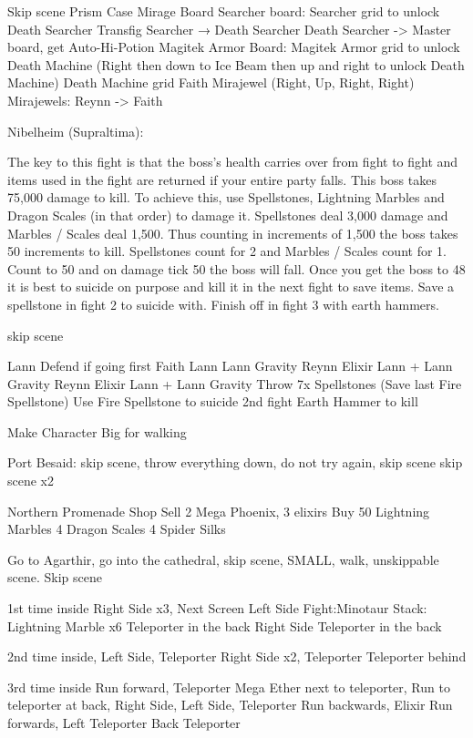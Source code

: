 Skip scene
Prism Case
Mirage Board
Searcher board:
Searcher grid to unlock Death Searcher
Transfig Searcher → Death Searcher
Death Searcher ->  
Master board, get Auto-Hi-Potion
Magitek Armor Board:
Magitek Armor grid to unlock Death Machine (Right then down to Ice Beam then up and right to unlock Death Machine)
Death Machine grid Faith Mirajewel (Right, Up, Right, Right)
Mirajewels:
Reynn -> Faith

Nibelheim (Supraltima):

The key to this fight is that the boss’s health carries over from fight to fight and items used in the fight are returned if your entire party falls. This boss takes 75,000 damage to kill. To achieve this, use Spellstones, Lightning Marbles and Dragon Scales (in that order) to damage it. Spellstones deal 3,000 damage and Marbles / Scales deal 1,500. Thus counting in increments of 1,500 the boss takes 50 increments to kill. Spellstones count for 2 and Marbles / Scales count for 1. Count to 50 and on damage tick 50 the boss will fall. Once you get the boss to 48 it is best to suicide on purpose and kill it in the next fight to save items. Save a spellstone in fight 2 to suicide with. Finish off in fight 3 with earth hammers.

skip scene

Lann Defend if going first
Faith Lann
Lann Gravity
Reynn Elixir Lann + Lann Gravity
Reynn Elixir Lann + Lann Gravity
Throw 7x Spellstones (Save last Fire Spellstone)
Use Fire Spellstone to suicide
2nd fight Earth Hammer to kill

Make Character Big for walking

Port Besaid: 
skip scene, throw everything down, do not try again, skip scene
skip scene x2

Northern Promenade
         Shop 
Sell
2 Mega Phoenix, 
3 elixirs
Buy
50 Lightning Marbles
4 Dragon Scales
4 Spider Silks
 
Go to Agarthir, go into the cathedral, skip scene, SMALL, walk, unskippable scene.
Skip scene
 
1st time inside
Right Side x3, Next Screen
Left Side
Fight:Minotaur Stack:
Lightning Marble x6
Teleporter in the back
Right Side
Teleporter in the back

2nd time inside, 
Left Side, Teleporter
Right Side x2, Teleporter 
Teleporter behind

3rd time inside 
Run forward, Teleporter
Mega Ether next to teleporter, 
Run to teleporter at back,
Right Side,  
Left Side, Teleporter
Run backwards, Elixir
Run forwards, Left Teleporter
Back Teleporter

